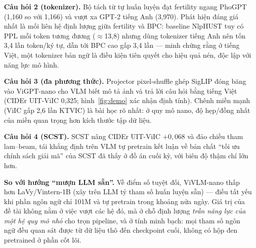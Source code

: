 \textbf{Câu hỏi 2 (tokenizer).} Bộ tách từ tự huấn luyện đạt fertility ngang
PhoGPT (1,160 so với 1,166) và vượt xa GPT-2 tiếng Anh (3,970). Phát hiện
đáng giá nhất là mối liên hệ định lượng giữa fertility và BPC: baseline
NlpHUST tuy có PPL mỗi token tương đương ($\approx$13,8) nhưng dùng tokenizer
tiếng Anh nên tốn 3,4 lần token/ký tự, dẫn tới BPC cao gấp 3,4 lần --- minh
chứng rằng ở tiếng Việt, một tokenizer bản ngữ là điều kiện tiên quyết cho
hiệu quả nén, độc lập với năng lực mô hình.

\textbf{Câu hỏi 3 (đa phương thức).} Projector pixel-shuffle ghép SigLIP đóng
băng vào ViGPT-nano cho VLM biết mô tả ảnh và trả lời câu hỏi bằng tiếng Việt
(CIDEr UIT-ViIC 0,325; hình~\ref{fig:demo} xác nhận định tính). Chênh miền
mạnh (ViIC gấp 2,6 lần KTVIC) là bài học rõ nhất: ở quy mô nano, độ hẹp/đồng
nhất của miền quan trọng hơn kích thước tập dữ liệu.

\textbf{Câu hỏi 4 (SCST).} SCST nâng CIDEr UIT-ViIC $+0{,}068$ và đảo chiều
tham lam--beam, tái khẳng định trên VLM tự pretrain kết luận về bản chất
``tối ưu chính sách giải mã'' của SCST đã thấy ở đồ án cuối kỳ, với biên độ
thậm chí lớn hơn.

\textbf{So với hướng ``mượn LLM sẵn''.} Về điểm số tuyệt đối, ViVLM-nano
thấp hơn LaVy/Vintern-1B (xây trên LLM tỷ tham số huấn luyện sẵn) --- điều
tất yếu khi phần ngôn ngữ chỉ 101M và tự pretrain trong khoảng nửa ngày. Giá
trị của đề tài không nằm ở việc vượt các hệ đó, mà ở chỗ định lượng \emph{trần
năng lực của một hệ quy mô nhỏ} cho trọn pipeline, và ở tính minh bạch: mọi tham số
ngôn ngữ đều quan sát được từ dữ liệu thô đến checkpoint cuối, không có hộp
đen pretrained ở phần cốt lõi.
